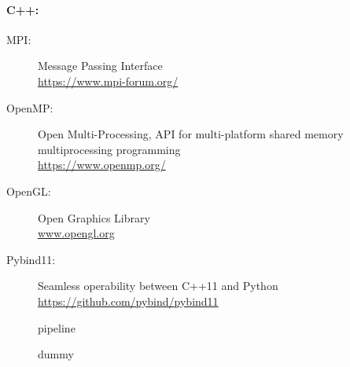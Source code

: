 \paragraph{C++:}
\begin{description}
\item[MPI:] Message Passing Interface \cite{message2015mpi}\\
\url{https://www.mpi-forum.org/}
\item[OpenMP:] Open Multi-Processing, API for multi-platform shared memory multiprocessing programming \cite{dagum1998openmp}\\
\url{https://www.openmp.org/}
\item[OpenGL:] Open Graphics Library \cite{khronos}\\
\url{www.opengl.org}
\item[Pybind11:] Seamless operability between C++11 and Python \cite{pybind11}\\ \url{https://github.com/pybind/pybind11} 
\end{description}
% 
% 
\begin{figure}[!t]
\centering
{}
\caption{pipeline}
\label{fig:sim_pipeline}
\end{figure}
% 
\begin{figure}[!t]
    \centering
	\caption{dummy}
	\label{fig:fastpli_wiki_home}
\end{figure}
% 
